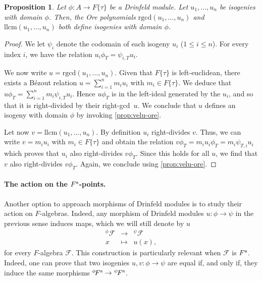 \documentclass[11pt]{article}
\newtheorem{proposition}[theorem]{Proposition}
\theoremstyle{definition}
\renewcommand\leq{\leqslant}
\newcommand{\Fs}{F^{\text{\rm s}}}
\newcommand{\phiact}[1]{{}^\phi\! #1}
\newcommand{\psiact}[1]{{}^\psi\! #1}
\newcommand{\Ftau}{F\{\tau\}}
\newcommand{\rgcd}{\mathrm{rgcd}}
\newcommand{\llcm}{\mathrm{llcm}}
\begin{document}
\begin{proposition}
\label{proposition:rgcd-isogeny}
Let $\phi : A\to F\{\tau\}$ be a Drinfeld module.
Let $u_1, \dots, u_n$ be isogenies with domain $\phi$. Then, the Ore polynomials $\rgcd(u_1, \dots, u_n)$ and 
$\llcm(u_1, \ldots, u_n)$ both define isogenies with domain $\phi$.
\end{proposition}

\begin{proof}
  We let $\psi_i$ denote the codomain of each isogeny $u_i$ ($1 \leq i \leq n$).
  For every index $i$, we have the relation $u_i \phi_T = \psi_{i,T} u_i$.

  We now write $u = \rgcd(u_1, \dots, u_n)$.
  Given that $\Ftau$ is left-euclidean, there exists a Bézout relation
  $u = \sum_{i=1}^n m_i u_i$ with $m_i \in F\{\tau\}$.
  We deduce that $u \phi_T = \sum_{i=1}^n m_i \psi_{i,T} u_i$. Hence
  $u \phi_T$ is in the left-ideal generated by the $u_i$, and so
  that it is right-divided by their right-gcd~$u$. 
  We conclude that $u$ defines an isogeny with domain $\phi$ by
  invoking \cref{prop:velu-ore}.

  Let now $v = \llcm(u_1, \ldots, u_n)$.
  By definition $u_i$ right-divides $v$. Thus, we can write 
  $v = m_i u_i$ with $m_i \in F\{\tau\}$ and obtain the relation
  $v \phi_T = m_i u_i \phi_T = m_i \psi_{T,i} u_i$ which proves
  that $u_i$ also right-divides $v \phi_T$. Since this holds for
  all $u$, we find that $v$ also right-divides $v \phi_T$. Again,
  we conclude using \cref{prop:velu-ore}.
\end{proof}

\paragraph{The action on the \texorpdfstring{$\Fs$}{F\^s}-points.}

Another option to approach morphisms of Drinfeld modules is to study their action on $F$-algebras.
Indeed, any morphism of Drinfeld modules $u: \phi \to \psi$ in the previous sense induces maps, which we will still denote by $u$
$$\begin{array}{rcl}
\phiact{\mathcal F} & \to & \psiact{\mathcal F} \\
x & \mapsto &  u(x),
\end{array}$$
for every $F$-algebra $\mathcal F$. 
This construction is particularly relevant when $\mathcal F$ is $\Fs$. Indeed, one can prove that two isogenies $u, v : \phi \to \psi$ are 
equal if, and only if, they induce the same morphisms $\phiact{\Fs}\to 
\psiact{\Fs}$.
\end{document}

